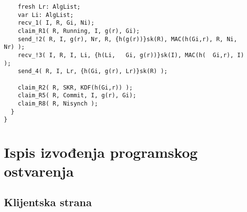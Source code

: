 \begin{subappendices}
\begin{small}
\begin{verbatim}
    fresh Lr: AlgList;
    var Li: AlgList;
    recv_1( I, R, Gi, Ni);
    claim_R1( R, Running, I, g(r), Gi);
    send_!2( R, I, g(r), Nr, R, {h(g(r))}sk(R), MAC(h(Gi,r), R, Ni, Nr) );
    recv_!3( I, R, I, Li, {h(Li,   Gi, g(r))}sk(I), MAC(h(  Gi,r), I) );
    send_4( R, I, Lr, {h(Gi, g(r), Lr)}sk(R) );
    
    claim_R2( R, SKR, KDF(h(Gi,r)) );
    claim_R5( R, Commit, I, g(r), Gi);
    claim_R8( R, Nisynch );
  }
}
\end{verbatim}
\end{small}

\section{Ispis izvođenja programskog ostvarenja} \label{app:impl}

\subsection{Klijentska strana} \label{app:cli_impl}


\end{subappendices}
